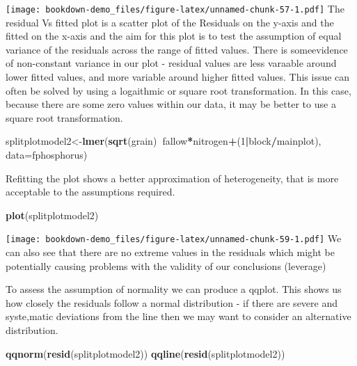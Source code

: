 \documentclass[]{book}
\newenvironment{Shaded}{\begin{snugshade}}{\end{snugshade}}
\newcommand{\KeywordTok}[1]{\textcolor[rgb]{0.13,0.29,0.53}{\textbf{#1}}}
\newcommand{\DataTypeTok}[1]{\textcolor[rgb]{0.13,0.29,0.53}{#1}}
\newcommand{\DecValTok}[1]{\textcolor[rgb]{0.00,0.00,0.81}{#1}}
\newcommand{\OperatorTok}[1]{\textcolor[rgb]{0.81,0.36,0.00}{\textbf{#1}}}
\newcommand{\NormalTok}[1]{#1}
\theoremstyle{definition}
\theoremstyle{definition}
\theoremstyle{definition}
\theoremstyle{remark}
\begin{document}
\texttt{[image: bookdown-demo\_files/figure-latex/unnamed-chunk-57-1.pdf]}
The residual Vs fitted plot is a scatter plot of the Residuals on the
y-axis and the fitted on the x-axis and the aim for this plot is to test
the assumption of equal variance of the residuals across the range of
fitted values. There is someevidence of non-constant variance in our
plot - residual values are less varaable around lower fitted values, and
more variable around higher fitted values. This issue can often be
solved by using a logaithmic or square root transformation. In this
case, because there are some zero values within our data, it may be
better to use a square root transformation.

\begin{Shaded}
\begin{Highlighting}[]
\NormalTok{splitplotmodel2<-}\KeywordTok{lmer}\NormalTok{(}\KeywordTok{sqrt}\NormalTok{(grain)}\OperatorTok{~}\NormalTok{fallow}\OperatorTok{*}\NormalTok{nitrogen}\OperatorTok{+}\NormalTok{(}\DecValTok{1}\OperatorTok{|}\NormalTok{block}\OperatorTok{/}\NormalTok{mainplot), }\DataTypeTok{data=}\NormalTok{fphosphorus)}
\end{Highlighting}
\end{Shaded}

Refitting the plot shows a better approximation of heterogeneity, that
is more acceptable to the assumptions required.

\begin{Shaded}
\begin{Highlighting}[]
\KeywordTok{plot}\NormalTok{(splitplotmodel2)}
\end{Highlighting}
\end{Shaded}

\texttt{[image: bookdown-demo\_files/figure-latex/unnamed-chunk-59-1.pdf]}
We can also see that there are no extreme values in the residuals which
might be potentially causing problems with the validity of our
conclusions (leverage)

To assess the assumption of normality we can produce a qqplot. This
shows us how closely the residuals follow a normal distribution - if
there are severe and syste,matic deviations from the line then we may
want to consider an alternative distribution.

\begin{Shaded}
\begin{Highlighting}[]
\KeywordTok{qqnorm}\NormalTok{(}\KeywordTok{resid}\NormalTok{(splitplotmodel2))}
\KeywordTok{qqline}\NormalTok{(}\KeywordTok{resid}\NormalTok{(splitplotmodel2))}
\end{Highlighting}
\end{Shaded}
\end{document}
